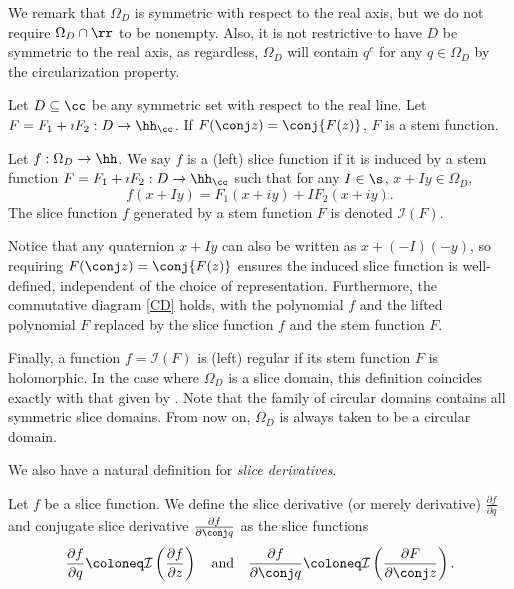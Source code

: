 \documentclass{amsart}
\begin{document}
We remark that $\Omega_D$ is symmetric with respect to the real axis, but we do not require $\Omega_D \cap \rr$ to be nonempty. Also, it is not restrictive to have $D$ be symmetric to the real axis, as regardless, $\Omega_D$ will contain $q^c$ for any $q\in\Omega_D$ by the circularization property. 

\begin{defin}
    Let $D\subseteq \cc$ be any symmetric set with respect to the real line. Let $F=F_1+\imath F_2:D \to \hh_\cc$. If $F(\conj z)=\conj{F(z)}$, $F$ is a stem function. 
\end{defin}

\begin{defin}
    Let $f:\Omega_D\to\hh$. We say $f$ is a (left) slice function if it is induced by a stem function $F=F_1+\imath F_2:D \to \hh_\cc$ such that for any $I \in \s$, $x +Iy\in\Omega_D$, \[f(x + Iy)=F_1(x+iy)+IF_2(x +iy).\] The slice function $f$ generated by a stem function $F$ is denoted $\mathcal{I}(F)$.  
\end{defin}

Notice that any quaternion $x+Iy$ can also be written as $x+(-I)(-y)$, so requiring $F(\conj z)=\conj{F(z)}$ ensures the induced slice function is well-defined, independent of the choice of representation. Furthermore, the commutative diagram \ref{CD} holds, with the polynomial $f$ and the lifted polynomial $F$ replaced by the slice function $f$ and the stem function $F$. 

Finally, a function $f=\mathcal{I}(F)$ is (left) regular if its stem function $F$ is holomorphic. In the case where $\Omega_D$ is a slice domain, this definition coincides exactly with that given by \cite{GENTILI2007279}. Note that the family of circular domains contains all symmetric slice domains. From now on, $\Omega_D$ is always taken to be a circular domain. 

We also have a natural definition for \emph{slice derivatives}. 

\begin{defin}
    Let $f$ be a slice function. We define the slice derivative (or merely derivative) $\frac{\partial f}{\partial q}$ and conjugate slice derivative $\frac{\partial f}{\partial \conj q}$ as the slice functions \[\frac{\partial f}{\partial q}\coloneq \mathcal{I}\left(\frac{\partial f}{\partial z}\right) \quad \text{and} \quad \frac{\partial f}{\partial \conj q}\coloneq \mathcal I \left(\frac{\partial F}{\partial \conj z}\right).\] 
\end{defin}
\end{document}
